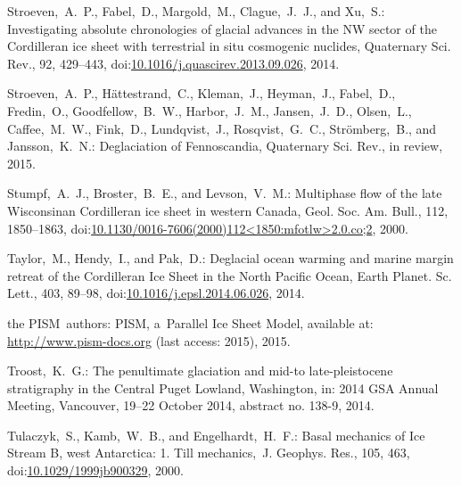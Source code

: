 \documentclass[tc, manuscript]{copernicus}
\begin{document}
\begin{thebibliography}{114}
Stroeven,~A.~P., Fabel,~D., Margold,~M., Clague,~J.~J., and Xu,~S.: Investigating absolute chronologies of glacial advances in the {NW} sector of the Cordilleran ice sheet with terrestrial in situ cosmogenic nuclides, Quaternary Sci. Rev., 92, 429--443,
doi:\href{http://dx.doi.org/10.1016/j.quascirev.2013.09.026}{10.1016/j.quascirev.2013.09.026}, 2014.


Stroeven,~A.~P., H{\"a}ttestrand,~C., Kleman,~J., Heyman,~J., Fabel,~D.,
Fredin,~O., Goodfellow,~B.~W., Harbor,~J.~M., Jansen,~J.~D., Olsen,~L.,
Caffee,~M.~W., Fink,~D., Lundqvist,~J., Rosqvist,~G.~C., Str\"omberg,~B., and
Jansson,~K.~N.: Deglaciation of Fennoscandia, Quaternary Sci. Rev., in
review, 2015.


Stumpf,~A.~J., Broster,~B.~E., and Levson,~V.~M.: Multiphase flow of the late Wisconsinan Cordilleran ice sheet in western Canada, Geol. Soc. Am. Bull., 112, 1850--1863,
doi:\href{http://dx.doi.org/10.1130/0016-7606(2000)112<1850:mfotlw>2.0.co;2}{10.1130/0016-7606(2000)112\textless1850:mfotlw\textgreater2.0.co;2}, 2000.


Taylor,~M., Hendy,~I., and Pak,~D.: Deglacial ocean warming and marine margin retreat of the Cordilleran Ice Sheet in the North Pacific Ocean, Earth Planet. Sc. Lett., 403, 89--98,
doi:\href{http://dx.doi.org/10.1016/j.epsl.2014.06.026}{10.1016/j.epsl.2014.06.026}, 2014.


the PISM~authors: {PISM}, a~{P}arallel {I}ce {S}heet {M}odel, available at:
\url{http://www.pism-docs.org} (last access: 2015), 2015.


Troost,~K.~G.: The penultimate glaciation and mid-to late-pleistocene
stratigraphy in the Central Puget Lowland, Washington, in: 2014 GSA Annual
Meeting, Vancouver, 19--22 October 2014, abstract no. 138-9, 2014.



Tulaczyk,~S., Kamb,~W.~B., and Engelhardt,~H.~F.: Basal mechanics of Ice Stream B, west Antarctica: 1. Till mechanics,~J. Geophys. Res., 105, 463,
doi:\href{http://dx.doi.org/10.1029/1999jb900329}{10.1029/1999jb900329}, 2000.



\end{thebibliography}
\end{document}
